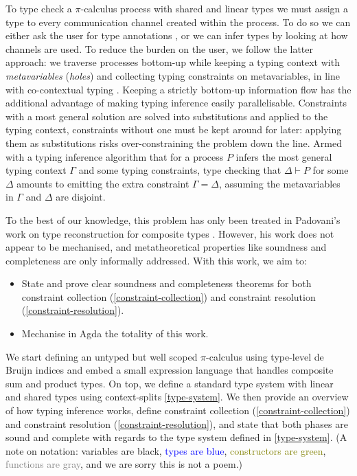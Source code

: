 \documentclass[sigplan,screen,review]{acmart}
\newcommand{\picalc}{$\pi$-calculus}
\begin{document}
To type check a \picalc{} process with shared and linear types we must assign a type to every communication channel created within the process.
To do so we can either ask the user for type annotations \cite{ZalakainD21}, or we can infer types by looking at how channels are used.
To reduce the burden on the user, we follow the latter approach: we traverse processes bottom-up while keeping a typing context with \emph{metavariables} (\emph{holes}) and collecting typing constraints on metavariables, in line with co-contextual typing \cite{ErdwegBKKM15}.
Keeping a strictly bottom-up information flow has the additional advantage of making typing inference easily parallelisable.
Constraints with a most general solution are solved into substitutions and applied to the typing context, constraints without one must be kept around for later: applying them as substitutions risks over-constraining the problem down the line.
Armed with a typing inference algorithm that for a process $P$ infers the most general typing context $\Gamma$ and some typing constraints, type checking that $\Delta \vdash P$ for some $\Delta$ amounts to emitting the extra constraint $\Gamma = \Delta$, assuming the metavariables in $\Gamma$ and $\Delta$ are disjoint.

To the best of our knowledge, this problem has only been treated in Padovani's work on type reconstruction for composite types \cite{Padovani15}.
However, his work does not appear to be mechanised, and metatheoretical properties like soundness and completeness are only informally addressed.
With this work, we aim to:
\begin{itemize}
  \item State and prove clear soundness and completeness theorems for both constraint collection (\autoref{constraint-collection}) and constraint resolution (\autoref{constraint-resolution}).
  \item Mechanise in Agda the totality of this work.
\end{itemize}

We start defining an untyped but well scoped \picalc{} using type-level de Bruijn indices \cite{deBruijn72} and embed a small expression language that handles composite sum and product types.
On top, we define a standard type system with linear and shared types using context-splits \autoref{type-system}.
We then provide an overview of how typing inference works, define constraint collection (\autoref{constraint-collection}) and constraint resolution (\autoref{constraint-resolution}), and state that both phases are sound and complete with regards to the type system defined in \autoref{type-system}.
(A note on notation: variables are black, \textcolor{blue}{types are blue}, \textcolor{olive}{constructors are green}, \textcolor{gray}{functions are gray}, and we are sorry this is not a poem.)
\end{document}
